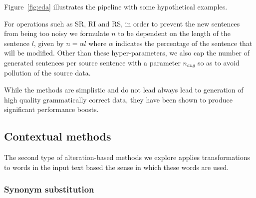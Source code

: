 \documentclass[11pt,a4paper]{article}
\begin{document}
Figure~\ref{fig:eda} illustrates the pipeline with some hypothetical examples.

For operations such as SR, RI and RS, in order to prevent the new sentences from being too noisy we formulate $n$ to be dependent on the length of the sentence $l$, given by $n = \alpha l $ where $\alpha$ indicates the percentage of the sentence that will be modified. Other than these hyper-parameters, we also cap the number of generated sentences per source sentence with a parameter $n_{aug}$ so as to avoid pollution of the source data.

While the methods are simplistic and do not lead always lead to generation of high quality grammatically correct data, they have been shown to produce significant performance boosts.


\subsection{Contextual methods}
The second type of alteration-based methods we explore applies transformations to words in the input text based the sense in which these words are used.

\subsubsection{Synonym substitution}
\end{document}
